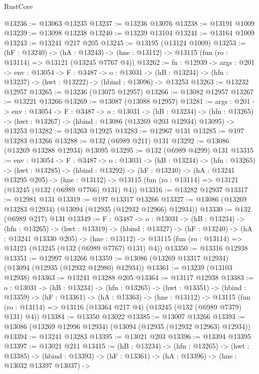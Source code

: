 \begin{lexlean}{RustCore}
\begin{coremodule}
@13236 := @13063 @13235
@13237 := @13236 @13076
@13238 := @13191 @1009
@13239 := @13098 @13238
@13240 := @13239 @13104
@13241 := @13164 @1009
@13243 := @13241 @217 @205
@13245 := @13195 (@13124 @1009)
@13253 := (hF : @13240) ->
  (hA : @13243) -> (hne : @13112) -> @13115 (fun (ro : @13114) => @13121 (@13245 @7767 @4))
@13262 := {fn : @12939} ->
  {args : @201} ->
  {env : @13054} ->
  {F : @3487} ->
  {o : @13031} -> (hB : @13234) -> (hfn : @13237) -> (hwt : @13222) -> (hbind : @13096) -> @13253
@13263 := @13232 @12957
@13265 := @13236 (@13075 @12957)
@13266 := @13082 @12957
@13267 := @13221 @13266
@13269 := @13087 (@13088 @12957)
@13281 := {args : @201} ->
  {env : @13054} ->
  {F : @3487} ->
  {o : @13031} ->
  (hB : @13234) ->
  (hfn : @13265) -> (hwt : @13267) -> (hbind : @13086 (@13269 @203 @12934) @13095) -> @13253
@13282 := @13263 @12925
@13283 := @12967 @131
@13285 := @197 @13283 @13266
@13288 := @132 (@6989 @211) @131
@13292 := @13086 (@13269 @13288 @12934) @13095
@13295 := @132 (@6989 @4299) @131
@13315 := {env : @13054} ->
  {F : @3487} ->
  {o : @13031} ->
  (hB : @13234) ->
  (hfn : @13265) ->
  (hwt : @13285) ->
  (hbind : @13292) ->
  (hF : @13240) ->
  (hA : @13241 @13295 @205) ->
  (hne : @13112) -> @13115 (fun (ro : @13114) => @13121 (@13245 (@132 (@6989 @7766) @131) @4))
@13316 := @13282 @12937
@13317 := @12981 @131
@13319 := @197 @13317 @13266
@13327 := @13086 (@13269 @13283 @12934) (@13094 (@12935 (@12932 @12966) @12934))
@13330 := @132 (@6989 @217) @131
@13349 := {F : @3487} ->
  {o : @13031} ->
  (hB : @13234) ->
  (hfn : @13265) ->
  (hwt : @13319) ->
  (hbind : @13327) ->
  (hF : @13240) ->
  (hA : @13241 @13330 @205) ->
  (hne : @13112) -> @13115 (fun (ro : @13114) => @13121 (@13245 (@132 (@6989 @7767) @131) @4))
@13350 := @13316 @12938
@13351 := @12997 @13266
@13359 := @13086 (@13269 @13317 @12934) (@13094 (@12935 (@12932 @12980) @12934))
@13361 := @13239 (@13103 @12938)
@13363 := @13241 @13288 @205
@13364 := @13117 @12938
@13383 := {o : @13031} ->
  (hB : @13234) ->
  (hfn : @13265) ->
  (hwt : @13351) ->
  (hbind : @13359) ->
  (hF : @13361) ->
  (hA : @13363) ->
  (hne : @13112) ->
  @13115 (fun (ro : @13114) => @13116 (@13364 @217 @4) (@13245 (@132 (@6989 @7379) @131) @4))
@13384 := @13350 @13022
@13385 := @13007 @13266
@13393 := @13086 (@13269 @12996 @12934) (@13094 (@12935 (@12932 @12963) @12934))
@13394 := @13241 @13283
@13395 := @13021 @203
@13396 := @13394 @13395
@13397 := @13021 @211
@13415 := (hB : @13234) ->
  (hfn : @13265) ->
  (hwt : @13385) ->
  (hbind : @13393) ->
  (hF : @13361) ->
  (hA : @13396) ->
  (hne : @13032 @13397 @13037) ->

\end{coremodule}
\end{lexlean}
